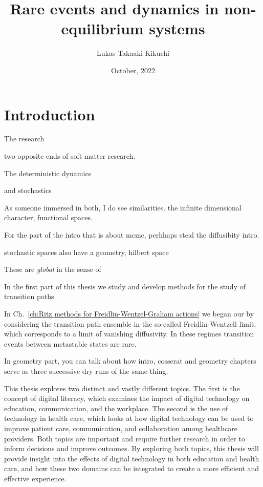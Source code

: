 \documentclass[]{cam-thesis}
\title{Rare events and dynamics in non-equilibrium systems}
\author{Lukas Takaaki Kikuchi}
\date{October, 2022}
\begin{document}
\frontmatter{}









\chapter*{Introduction}

The research 

two opposite ends of soft matter research. 

The deterministic dynamics

 and stochastics
 
As someone immersed in both, I do see similarities. the infinite dimensional character, functional spaces.

For the part of the intro that is about mcmc, perhhaps steal the diffusibity intro.

stochastic spaces also have a geometry, hilbert space

These are \textit{global} in the sense of

In the first part of this thesis we study and develop methods for the study of transition paths

In Ch.~\ref{ch:Ritz methods for Freidlin-Wentzel-Graham actions} we began our by considering the transition path ensemble in the so-called Freidlin-Wentzell limit, which corresponds to a limit of vanishing diffusivity. {\color{red} In these regimes transition events between metastable states are rare.}


In geometry part, you can talk about how intro, cosserat and geometry chapters serve as three successive dry runs of the same thing.





This thesis explores two distinct and vastly different topics. The first is the concept of digital literacy, which examines the impact of digital technology on education, communication, and the workplace. The second is the use of technology in health care, which looks at how digital technology can be used to improve patient care, communication, and collaboration among healthcare providers. Both topics are important and require further research in order to inform decisions and improve outcomes. By exploring both topics, this thesis will provide insight into the effects of digital technology in both education and health care, and how these two domains can be integrated to create a more efficient and effective experience.
\end{document}
